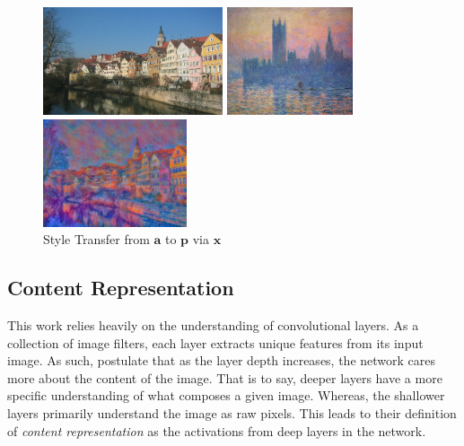 \documentclass{article}
\begin{document}
\begin{figure}
\centering
\caption{Style Transfer from $\textbf{a}$ to $\textbf{p}$ via $\textbf{x}$}
\label{basic-example}
\begin{minipage}{0.3\linewidth}
    \includegraphics[width=\textwidth,height=1.25in]{img/content/tubingen}
\end{minipage}
\begin{minipage}{0.3\linewidth}
    \includegraphics[width=\textwidth,height=1.25in]{img/artworks/houses-of-parliament}
\end{minipage}
\begin{minipage}{0.3\linewidth}
    \includegraphics[width=\textwidth,height=1.25in]{img/transfer/houses-of-parliament-tv-1e0}
\end{minipage}
\end{figure}

\subsection{Content Representation}

This work relies heavily on the understanding of convolutional layers. As a
collection of image filters, each layer extracts unique features from its
input image. As such, \cite{2015arXiv150806576G} postulate that as the layer
depth increases, the network cares more about the content of the image. That
is to say, deeper layers have a more specific understanding of what composes
a given image. Whereas, the shallower layers primarily understand the image
as raw pixels. This leads to their definition of \textit{content
representation} as the activations from deep layers in the network.
\end{document}
